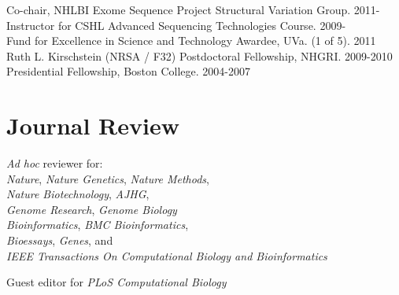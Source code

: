 \documentclass[margin,line]{cv}
\begin{document}
\begin{resume}
    Co-chair, NHLBI Exome Sequence Project Structural Variation Group. 2011-                           \\\vspace{1mm}%
    Instructor for CSHL Advanced Sequencing Technologies Course. 2009-                                 \\\vspace{1mm}%
    Fund for Excellence in Science and Technology Awardee, UVa. (1 of 5). 2011                         \\\vspace{1mm}%
    Ruth L. Kirschstein (NRSA / F32) Postdoctoral Fellowship, NHGRI. 2009-2010                         \\\vspace{1mm}%
    Presidential Fellowship, Boston College. 2004-2007                                                               %

    \section{\mysidestyle Journal Review}
    \textit{Ad hoc} reviewer for:\\
        \textit{Nature}, \textit{Nature Genetics}, \textit{Nature Methods},\\
        \textit{Nature Biotechnology}, \textit{AJHG}, \\
        \textit{Genome Research}, \textit{Genome Biology}\\
	      \textit{Bioinformatics}, \textit{BMC Bioinformatics},\\
          \textit{Bioessays}, \textit{Genes}, and \\
        \textit{IEEE Transactions On Computational Biology and Bioinformatics}

    Guest editor for \textit{PLoS Computational Biology}


\end{resume}
\end{document}
